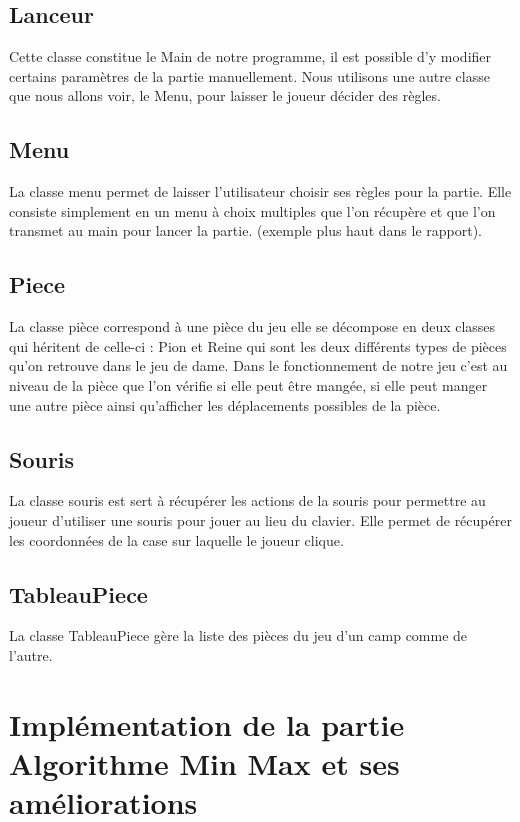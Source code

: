 \documentclass[12,french]{report}
\begin{document}
\subsection{Lanceur}

Cette classe constitue le Main de notre programme, il est possible d'y modifier certains paramètres de la partie manuellement. Nous utilisons une autre classe que nous allons voir, le Menu, pour laisser le joueur décider des règles.

\subsection{Menu}

La classe menu permet de laisser l'utilisateur choisir ses règles pour la partie. Elle consiste simplement en un menu à choix multiples que l'on récupère et que l'on transmet au main pour lancer la partie. (exemple plus haut dans le rapport).

\subsection{Piece}

La classe pièce correspond à une pièce du jeu elle se décompose en deux classes qui héritent de celle-ci : Pion et Reine qui sont les deux différents types de pièces qu'on retrouve dans le jeu de dame. Dans le fonctionnement de notre jeu c'est au niveau de la pièce que l'on vérifie si elle peut être mangée, si elle peut manger une autre pièce ainsi qu'afficher les déplacements possibles de la pièce.

\subsection{Souris}

La classe souris est sert à récupérer les actions de la souris pour permettre au joueur d'utiliser une souris pour jouer au lieu du clavier. Elle permet de récupérer les coordonnées de la case sur laquelle le joueur clique. 

\subsection{TableauPiece}

La classe TableauPiece gère la liste des pièces du jeu d'un camp comme de l'autre.


\section{Implémentation de la partie Algorithme Min Max et ses améliorations}
\end{document}
